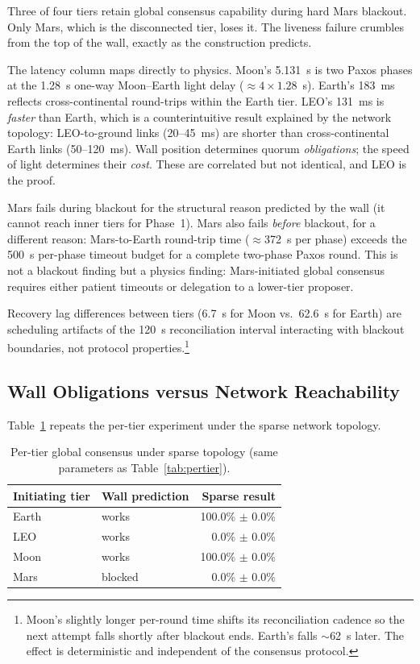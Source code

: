 \documentclass[11pt]{article}
\begin{document}
Three of four tiers retain global consensus capability during hard Mars blackout. Only Mars, which is the disconnected tier, loses it. The liveness failure crumbles from the top of the wall, exactly as the construction predicts.

The latency column maps directly to physics. Moon's 5.131~s is two Paxos phases at the 1.28~s one-way Moon--Earth light delay ($\approx 4 \times 1.28$~s). Earth's 183~ms reflects cross-continental round-trips within the Earth tier. LEO's 131~ms is \emph{faster} than Earth, which is a counterintuitive result explained by the network topology: LEO-to-ground links (20--45~ms) are shorter than cross-continental Earth links (50--120~ms). Wall position determines quorum \emph{obligations}; the speed of light determines their \emph{cost}. These are correlated but not identical, and LEO is the proof.

Mars fails during blackout for the structural reason predicted by the wall (it cannot reach inner tiers for Phase~1). Mars also fails \emph{before} blackout, for a different reason: Mars-to-Earth round-trip time ($\approx$372~s per phase) exceeds the 500~s per-phase timeout budget for a complete two-phase Paxos round. This is not a blackout finding but a physics finding: Mars-initiated global consensus requires either patient timeouts or delegation to a lower-tier proposer.

Recovery lag differences between tiers (6.7~s for Moon vs.\ 62.6~s for Earth) are scheduling artifacts of the 120~s reconciliation interval interacting with blackout boundaries, not protocol properties.\footnote{Moon's slightly longer per-round time shifts its reconciliation cadence so the next attempt falls shortly after blackout ends. Earth's falls $\sim$62~s later. The effect is deterministic and independent of the consensus protocol.}


\subsection{Wall Obligations versus Network Reachability}
\label{sec:reachability}

Table~\ref{tab:sparse} repeats the per-tier experiment under the sparse network topology.

\begin{table}[t]
\centering
\small
\caption{Per-tier global consensus under sparse topology (same parameters as Table~\ref{tab:pertier}).}
\label{tab:sparse}
\begin{tabular}{llr}
\toprule
Initiating tier & Wall prediction & Sparse result \\
\midrule
Earth & works & 100.0\% $\pm$ 0.0\% \\
LEO & works & 0.0\% $\pm$ 0.0\% \\
Moon & works & 100.0\% $\pm$ 0.0\% \\
Mars & blocked & 0.0\% $\pm$ 0.0\% \\
\bottomrule
\end{tabular}
\end{table}
\end{document}
